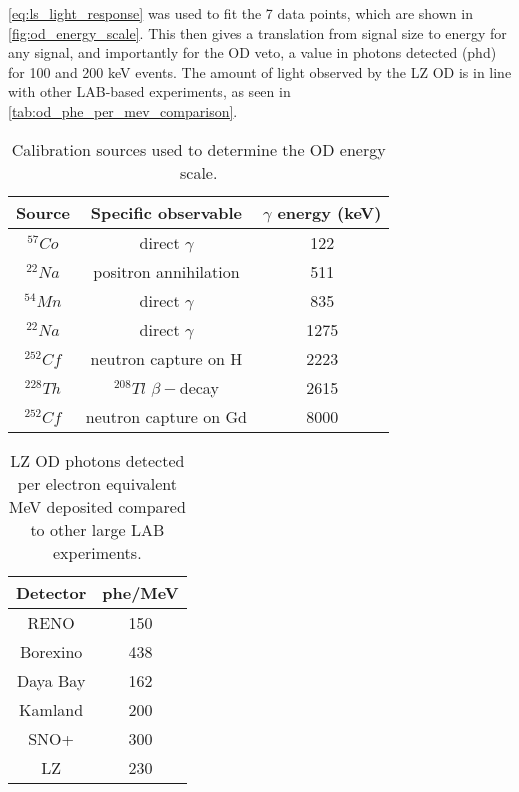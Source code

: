 \par
\autoref{eq:ls_light_response} was used to fit the 7 data points, which are shown in \autoref{fig:od_energy_scale}.
This then gives a translation from signal size to energy for any signal, and importantly for the OD veto, a value in photons detected (phd) for 100 and 200 keV events.
The amount of light observed by the LZ OD is in line with other LAB-based experiments, as seen in \autoref{tab:od_phe_per_mev_comparison}.
\begin{table}[]%
    \centering
    \begin{tabular}{c|c|c}
        Source      & Specific observable         &  $\gamma$ energy (keV) \\ \hline
        ${}^{57}Co$ & direct $\gamma$             & 122                        \\
        ${}^{22}Na$ & positron annihilation       & 511               \\
        ${}^{54}Mn$ & direct $\gamma$             & 835                        \\
        ${}^{22}Na$ & direct $\gamma$             & 1275               \\
        ${}^{252}Cf$ & neutron capture on H       & 2223            \\
        ${}^{228}Th$ & ${}^{208}Tl$ $\beta-$decay & 2615            \\
        ${}^{252}Cf$ & neutron capture on Gd      & 8000            
        
    \end{tabular}
    \caption{Calibration sources used to determine the OD energy scale.}
    \label{tab:od_energy_calibration_sources}
\end{table}



\begin{table}[]%
    \centering
    \begin{tabular}{c|c}
        Detector & phe/MeV \\ \hline
        RENO     & 150 \cite{reno_phe_per_mev_ref} \\
        Borexino & 438 \cite{pablo_mosteiro_thesis_ref} \\
        Daya Bay & 162 \cite{dayabay_phe_per_mev_ref} \\
        Kamland  & 200 \cite{kamland_phe_per_mev_ref} \\
        SNO+     & 300 \cite{snoplus_phe_per_mev_ref} \\
        LZ       & 230 
    \end{tabular}
    \caption{LZ OD photons detected per electron equivalent MeV deposited compared to other large LAB experiments.}
    \label{tab:od_phe_per_mev_comparison}
\end{table}

